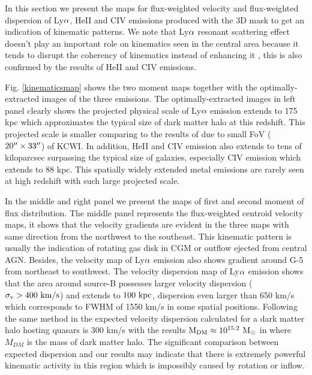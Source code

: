 \documentclass[../Results.tex]{subfiles}
\begin{document}
In this section we present the maps for flux-weighted velocity and flux-weighted dispersion of Ly$\rm \alpha$, HeII and CIV emissions produced with the 3D mask to get an indication of kinematic patterns. We note that Ly$\rm \alpha$ resonant scattering effect doesn't play an important role on kinematics seen in the central area because it tends to disrupt the coherency of kinematics instead of enhancing it \citep{Cantalupo2005Fluorescent}, this is also confirmed by the results of HeII and CIV emissions.

Fig. \ref{kinematicsmap} shows the two moment maps together with the optimally-extracted images of the three emissions. The optimally-extracted images in left panel clearly shows the projected physical scale of Ly$\rm \alpha$ emission extends to 175 kpc which approximates the typical size of dark matter halo at this redshift. This projected scale is smaller comparing to the results of \citet{cai2017discovery} due to small FoV ($\rm 20\mbox{$^{\prime\prime}$} \times 33\mbox{$^{\prime\prime}$}$) of KCWI. In addition, HeII and CIV emission also extends to tens of kiloparcsec surpassing the typical size of galaxies, especially CIV emission which extends to 88 kpc. This spatially widely extended metal emissions are rarely seen at high redshift with such large projected scale.

In the middle and right panel we present the maps of first and second moment of flux distribution. The middle panel represents the flux-weighted centroid velocity maps, it shows that the velocity gradients are evident in the three maps with same direction from the northwest to the southeast. This kinematic pattern is usually the indication of rotating gas disk in CGM or outflow ejected from central AGN. Besides, the velocity map of Ly$\rm \alpha$ emission also shows gradient around G-5 from northeast to southwest.  The velocity dispersion map of Ly$\rm \alpha$ emission shows that the area around source-B possesses larger velocity dispersion ($\rm \sigma_{v} > 400 \ km/s$) and extends to $\rm 100 \ kpc$, dispersion even larger than 650 km/s which corresponds to FWHM of 1550 km/s in some spatial positions. Following the same method in \citet{Arrigoni_Battaia_2018} the expected velocity dispersion calculated for a dark matter halo hosting quasars is 300 km/s with the results $\rm M_{DM} \approx 10^{15.2} \ M_{\odot}$ in \citet{arrigoni2018overdensity} where $M_{DM}$ is the mass of dark matter halo. The significant comparison between expected dispersion and our results may indicate that there is extremely powerful kinematic activity in this region which is impossibly caused by rotation or inflow.
\end{document}
